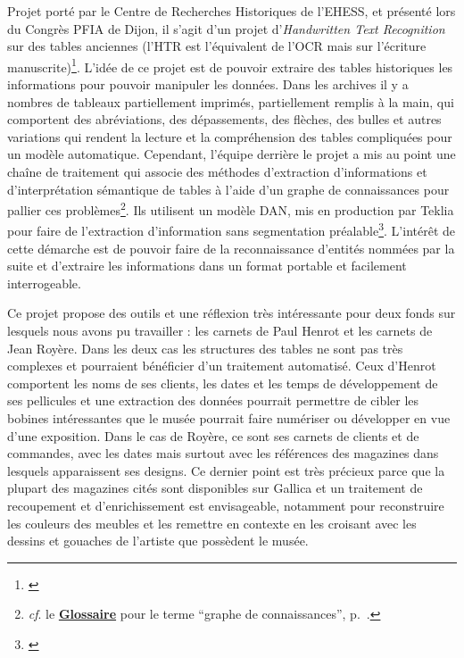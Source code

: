 Projet porté par le Centre de Recherches Historiques de l'EHESS, et présenté lors du Congrès PFIA de Dijon, il s'agit d'un projet d'\textit{Handwritten Text Recognition} sur des tables anciennes (l'HTR est l'équivalent de l'OCR mais sur l'écriture manuscrite)\footnote{\cite{tual_extraction_2025}}. L'idée de ce projet est de pouvoir extraire des tables historiques les informations pour pouvoir manipuler les données. Dans les archives il y a nombres de tableaux partiellement imprimés, partiellement remplis à la main, qui comportent des abréviations, des dépassements, des flèches, des bulles et autres variations qui rendent la lecture et la compréhension des tables compliquées pour un modèle automatique. Cependant, l'équipe derrière le projet a mis au point une chaîne de traitement qui associe des méthodes d'extraction d'informations et d'interprétation sémantique de tables à l'aide d'un graphe de connaissances pour pallier ces problèmes\footnote{\textit{cf}. le \textbf{\hyperref[sec:Glossaire]{Glossaire}} pour le terme \enquote{graphe de connaissances}, p.~\pageref{sec:Glossaire}.}. Ils utilisent un modèle DAN, mis en production par Teklia pour faire de l'extraction d'information sans segmentation préalable\footnote{\cite{noauthor_dan_nodate}}. L'intérêt de cette démarche est de pouvoir faire de la reconnaissance d'entités nommées par la suite et d'extraire les informations dans un format portable et facilement interrogeable.

Ce projet propose des outils et une réflexion très intéressante pour deux fonds sur lesquels nous avons pu travailler : les carnets de Paul Henrot et les carnets de Jean Royère. Dans les deux cas les structures des tables ne sont pas très complexes et pourraient bénéficier d'un traitement automatisé. Ceux d'Henrot comportent les noms de ses clients, les dates et les temps de développement de ses pellicules et une extraction des données pourrait permettre de cibler les bobines intéressantes que le musée pourrait faire numériser ou développer en vue d'une exposition. Dans le cas de Royère, ce sont ses carnets de clients et de commandes, avec les dates mais surtout avec les références des magazines dans lesquels apparaissent ses designs. Ce dernier point est très précieux parce que la plupart des magazines cités sont disponibles sur Gallica et un traitement de recoupement et d'enrichissement est envisageable, notamment pour reconstruire les couleurs des meubles et les remettre en contexte en les croisant avec les dessins et gouaches de l'artiste que possèdent le musée. 

